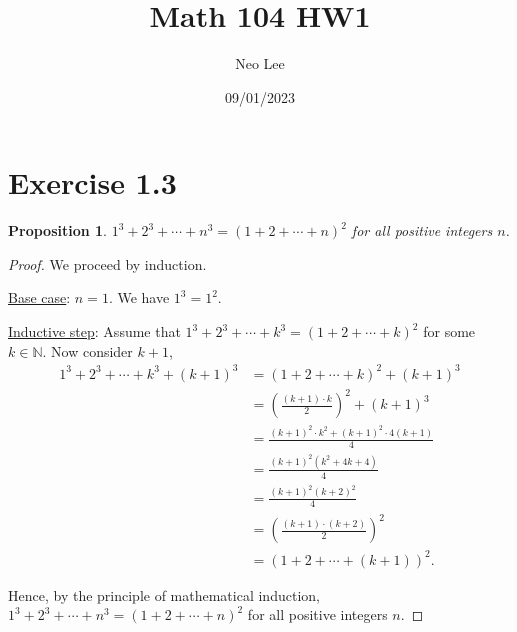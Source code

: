 \documentclass{article}
\title{Math 104 HW1}
\author{Neo Lee}
\date{09/01/2023}
\newtheorem{proposition}[thm]{Proposition}
\begin{document}
 

\maketitle 

\section*{Exercise 1.3}
\begin{proposition}
    $1^3 + 2^3 + \cdots + n^3 = (1+2+\cdots + n)^2$ for all positive integers $n$.
\end{proposition}    
\begin{proof}
    We proceed by induction.

    \underline{Base case}: $n=1$. We have $1^3 = 1^2$.

    \underline{Inductive step}: Assume that $1^3 + 2^3 + \cdots + k^3 = (1+2+\cdots +k)^2$ for 
    some $k \in \mathbb{N}$. Now consider $k+1$,
    \begin{align*}
        1^3 + 2^3 + \cdots + k^3 + (k+1)^3 & = (1+2+\cdots +k)^2 + (k+1)^3 \\
        & = \left(\frac{(k+1)\cdot k}{2}\right)^2 + (k+1)^3 \\ 
        & = \frac{(k+1)^2\cdot k^2 + (k+1)^2 \cdot 4(k+1)}{4} \\
        & = \frac{(k+1)^2(k^2 + 4k + 4)}{4} \\
        & = \frac{(k+1)^2(k+2)^2}{4} \\
        & = \left(\frac{(k+1)\cdot (k+2)}{2}\right)^2 \\
        & = (1+2+\cdots +(k+1))^2.
    \end{align*}

    Hence, by the principle of mathematical induction, $1^3 + 2^3 + \cdots + n^3 = 
    (1+2+\cdots + n)^2$ for all positive integers $n$.
\end{proof}
\end{document}
